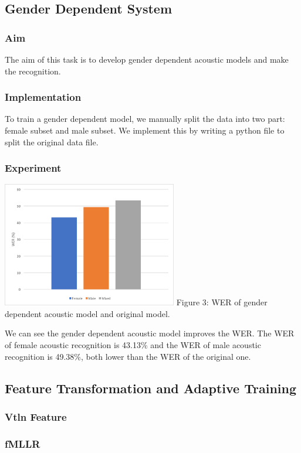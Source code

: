 \documentclass[]{article}
\begin{document}
\begin{multicols*}{2}
\subsection{Gender Dependent System}
\subsubsection{Aim}
The aim of this task is to develop gender dependent acoustic models and make the recognition.
\subsubsection{Implementation}
To train a gender dependent model, we manually split the data into two part: female subset and male subset. We implement this by writing a python file to split the original data file.

\subsubsection{Experiment}
\begin{center}
\includegraphics[width=3in]{Picture5.png} 
Figure 3: WER of gender dependent acoustic model and original model.
\end{center}

We can see the gender dependent acoustic model improves the WER. The WER of female acoustic  recognition is 43.13\% and the WER of male acoustic recognition is 49.38\%, both lower than the WER of the original one.

\subsection{Feature Transformation and Adaptive Training}
\subsubsection{Vtln Feature}
\subsubsection{fMLLR}

\end{multicols*}
\end{document}
